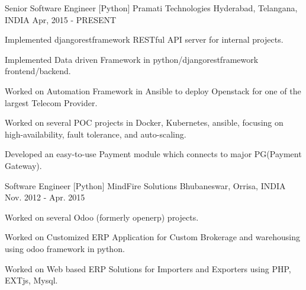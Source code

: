 

\begin{cventries}

  \cventry
    {Senior Software Engineer [Python]} %
    {Pramati Technologies} %
    {Hyderabad, Telangana, INDIA} %
    {Apr, 2015 - PRESENT} %
    {
      \begin{cvitems} %
        \item {Implemented djangorestframework RESTful API server for internal projects.}
        \item {Implemented Data driven Framework in python/djangorestframework frontend/backend. }
        \item {Worked on Automation Framework in Ansible to deploy Openstack for one of the largest Telecom Provider. }
        \item {Worked on several POC projects in Docker, Kubernetes, ansible, focusing on high-availability, fault tolerance, and auto-scaling. }
        \item {Developed an easy-to-use Payment module which connects to major PG(Payment Gateway).}
      \end{cvitems}
    }

  \cventry
    {Software Engineer [Python]} %
    {MindFire Solutions} %
    {Bhubaneswar, Orrisa, INDIA} %
    {Nov. 2012 - Apr. 2015} %
    {
      \begin{cvitems} %
        \item {Worked on several Odoo (formerly openerp) projects.}
        \item {Worked on Customized ERP Application for Custom Brokerage and warehousing using odoo framework in python.}
        \item {Worked on Web based ERP Solutions for Importers and Exporters using PHP, EXTjs, Mysql.}
      \end{cvitems}
    }


\end{cventries}
